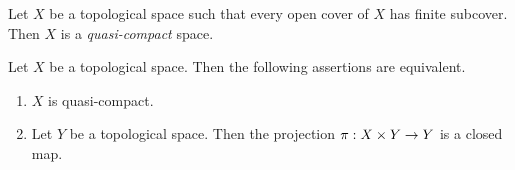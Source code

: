 \begin{definition}
	Let $X$ be a topological space such that every open cover of $X$ has finite subcover. Then $X$ is a \textit{quasi-compact} space.
\end{definition}

\begin{theorem}\label{theorem:Kuratowski_Mrowka_theorem}
	Let $X$ be a topological space. Then the following assertions are equivalent.
	\begin{enumerate}[label=\emph{\textbf{(\roman*)}}, leftmargin=3.0em]
		\item $X$ is quasi-compact.
		\item Let $Y$ be a topological space. Then the projection $\pi:X\times Y \rightarrow Y$ is a closed map.
	\end{enumerate}
\end{theorem}
